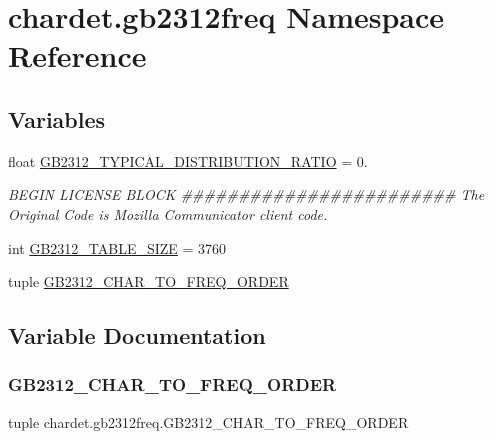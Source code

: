 \hypertarget{namespacechardet_1_1gb2312freq}{}\section{chardet.\+gb2312freq Namespace Reference}
\label{namespacechardet_1_1gb2312freq}
\subsection*{Variables}
\begin{DoxyCompactItemize}
\item 
float \hyperlink{namespacechardet_1_1gb2312freq_a1fccaccdd5afe148a4885e811188af14}{G\+B2312\+\_\+\+T\+Y\+P\+I\+C\+A\+L\+\_\+\+D\+I\+S\+T\+R\+I\+B\+U\+T\+I\+O\+N\+\_\+\+R\+A\+T\+IO} = 0.
\begin{DoxyCompactList}\small\item\em B\+E\+G\+IN L\+I\+C\+E\+N\+SE B\+L\+O\+CK \#\#\#\#\#\#\#\#\#\#\#\#\#\#\#\#\#\#\#\#\#\#\#\# The Original Code is Mozilla Communicator client code. \end{DoxyCompactList}\item 
int \hyperlink{namespacechardet_1_1gb2312freq_a7fa57a624b5e9b667133106dae813eba}{G\+B2312\+\_\+\+T\+A\+B\+L\+E\+\_\+\+S\+I\+ZE} = 3760
\item 
tuple \hyperlink{namespacechardet_1_1gb2312freq_a63c2a4a3197d4b1fb2424c0f008d7aa2}{G\+B2312\+\_\+\+C\+H\+A\+R\+\_\+\+T\+O\+\_\+\+F\+R\+E\+Q\+\_\+\+O\+R\+D\+ER}
\end{DoxyCompactItemize}


\subsection{Variable Documentation}
\mbox{\label{namespacechardet_1_1gb2312freq_a63c2a4a3197d4b1fb2424c0f008d7aa2}} 
\subsubsection{\texorpdfstring{G\+B2312\+\_\+\+C\+H\+A\+R\+\_\+\+T\+O\+\_\+\+F\+R\+E\+Q\+\_\+\+O\+R\+D\+ER}{GB2312\_CHAR\_TO\_FREQ\_ORDER}}
{\footnotesize\ttfamily tuple chardet.\+gb2312freq.\+G\+B2312\+\_\+\+C\+H\+A\+R\+\_\+\+T\+O\+\_\+\+F\+R\+E\+Q\+\_\+\+O\+R\+D\+ER}

